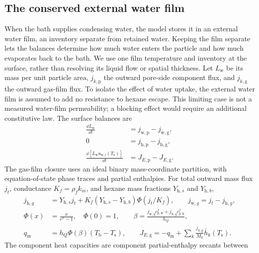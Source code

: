 \subsection{The conserved external water film}
\label{sec:model:waterfilm}

When the bath supplies condensing water, the model stores it in an
external water film, an inventory separate from retained water.
Keeping the film separate lets the balances determine how much water enters
the particle and how much evaporates back to the bath. We use one film
temperature and inventory at the surface, rather than resolving its liquid
flow or spatial thickness. Let $L_{\mathrm w}$ be its mass per
unit particle area, $j_{k,\mathrm p}$ the outward pore-side component flux,
and $j_{k,\mathrm g}$ the outward gas-film flux. To isolate the effect of
water uptake, the external water film is assumed to add no resistance to
hexane escape. This limiting case is not a measured water-film permeability;
a blocking effect would require an additional constitutive law.
The surface balances are
\begin{align}
\frac{\dd L_{\mathrm w}}{\dd t}
 &=j_{\mathrm w,\mathrm p}-j_{\mathrm w,\mathrm g},
\label{eq:externalwatermass}\\
0&=j_{\mathrm h,\mathrm p}-j_{\mathrm h,\mathrm g},
\label{eq:surfacehexanebalance}\\
\frac{\dd[L_{\mathrm w}u_{\mathrm w,l}(T_{\mathrm s})]}{\dd t}
 &=J_{E,\mathrm p}-J_{E,\mathrm g}.
\label{eq:externalwaternode}
\end{align}
The gas-film closure uses an ideal binary mass-coordinate partition,
with equation-of-state phase traces and partial enthalpies. For total outward
mass flux $j_t$, conductance $K_f=\rho_f k_m$, and hexane mass fractions
$Y_{\mathrm h,s}$ and $Y_{\mathrm h,b}$,
\begin{align}
j_{\mathrm h,g}&=Y_{\mathrm h,s}j_t+
 K_f(Y_{\mathrm h,s}-Y_{\mathrm h,b})\Phi(j_t/K_f),\qquad
j_{\mathrm w,g}=j_t-j_{\mathrm h,g},
\label{eq:gasfilmcomponents}\\
\Phi(x)&=\frac{x}{e^x-1},\quad \Phi(0)=1,\qquad
\beta=\frac{j_{\mathrm w,g}c_{p,\mathrm w}^{f}+
 j_{\mathrm h,g}c_{p,\mathrm h}^{f}}{h_Q},
\label{eq:ackermannfactor}\\
q_{\mathrm{in}}&=h_Q\Phi(\beta)(T_{\mathrm b}-T_{\mathrm s}),\qquad
J_{E,\mathrm g}=-q_{\mathrm{in}}+
 \sum_k\frac{j_{k,\mathrm g}}{M_k}\bar h_k(T_{\mathrm s}).
\label{eq:gasfilmenergy}
\end{align}
The component heat capacities are component partial-enthalpy secants between
